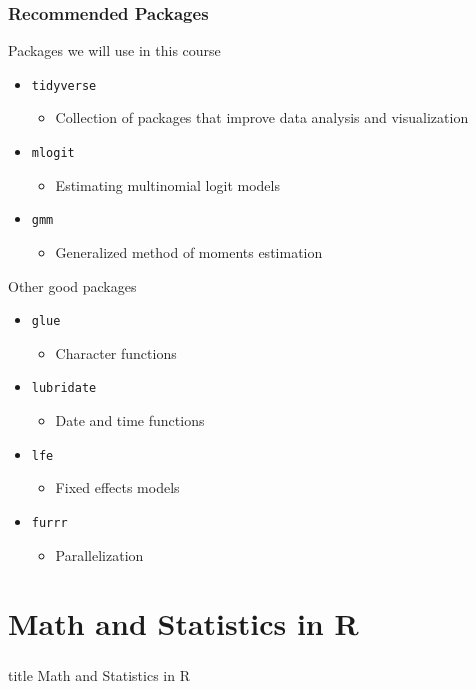 \documentclass{beamer}\usepackage[]{graphicx}\usepackage[]{color}
\begin{document}
\begin{frame}\frametitle{Recommended Packages}
    Packages we will use in this course
    \begin{itemize}
        \item \texttt{tidyverse}
        \begin{itemize}
            \item Collection of packages that improve data analysis and visualization
        \end{itemize}
        \item \texttt{mlogit}
        \begin{itemize}
            \item Estimating multinomial logit models
        \end{itemize}
        \item \texttt{gmm}
        \begin{itemize}
            \item Generalized method of moments estimation
        \end{itemize}
    \end{itemize}
    \vspace{0.5ex}
    Other good packages
    \begin{itemize}
        \item \texttt{glue}
        \begin{itemize}
            \item Character functions
        \end{itemize}
        \item \texttt{lubridate}
        \begin{itemize}
            \item Date and time functions
        \end{itemize}
        \item \texttt{lfe}
        \begin{itemize}
            \item Fixed effects models
        \end{itemize}
        \item \texttt{furrr}
        \begin{itemize}
            \item Parallelization
        \end{itemize}
    \end{itemize}
\end{frame}

\section{Math and Statistics in R}
\label{math}
\begin{frame}\frametitle{}
    \vfill
    \centering
    \begin{beamercolorbox}[center]{title}
        \Large Math and Statistics in R
    \end{beamercolorbox}
    \vfill
\end{frame}
\end{document}
